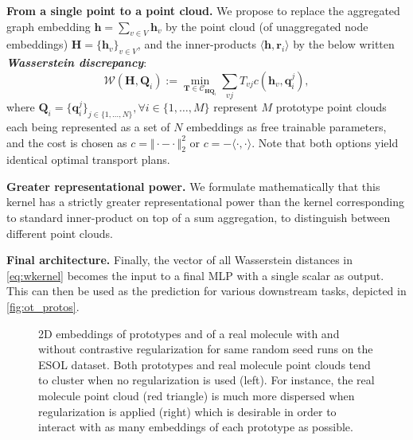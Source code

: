 \documentclass[letterpaper]{article} \usepackage{aaai22}  \usepackage{times}  \usepackage{helvet}  \usepackage{courier}  \usepackage[hyphens]{url}  \usepackage{graphicx} \urlstyle{rm} \def\UrlFont{\rm}  \usepackage{natbib}  \usepackage{caption} \DeclareCaptionStyle{ruled}{labelfont=normalfont,labelsep=colon,strut=off} \frenchspacing  \setlength{\pdfpagewidth}{8.5in}  \setlength{\pdfpageheight}{11in}  \usepackage{algorithm}
\newcommand{\h}{{\mathbf h}}
\newcommand{\T}{{\mathbf T}}
\newcommand{\Q}{{\mathbf Q}}
\newcommand{\q}{{\mathbf q}}
\newcommand{\Was}{{\mathcal W}}
\begin{document}
\textbf{From a single point to a point cloud. } We propose to replace the aggregated graph embedding $\h=\sum_{v\in V}\h_v$ by the point cloud (of unaggregated node embeddings) $\mathbf{H}=\{\h_v\}_{v\in V}$, and the inner-products $\langle \h,\mathbf{r}_i\rangle$ by the below written \textbf{\textit{Wasserstein discrepancy}}:
\begin{equation}
\Was(\mathbf{H}, \Q_i):=\min_{\T\in\mathcal{C}_{\mathbf{H} \Q_i}}\sum_{vj}T_{vj}c( \h_v, \q_i^j),
\label{eq:wkernel}
\end{equation}
where $\Q_i=\{\q_i^j\}_{j \in \{1,\ldots,N\}}, \forall i \in \{1,\ldots,M\}$ represent $M$ prototype point clouds each being represented as a set of $N$ embeddings as free trainable parameters, and the cost is chosen as $c=\Vert\cdot - \cdot\Vert_2^2$ or $c = - \langle \cdot,\cdot\rangle$. Note that both options yield identical optimal transport plans.

\textbf{Greater representational power. } We formulate mathematically that this kernel has a strictly greater representational power than the kernel corresponding to standard inner-product on top of a sum aggregation, to distinguish between different point clouds. 


\textbf{Final architecture. } Finally, the vector of all Wasserstein distances in \cref{eq:wkernel} becomes the input to a final MLP with a single scalar as output. This can then be used as the prediction for various downstream tasks, depicted in \cref{fig:ot_protos}.


\begin{figure*}[h]
   \hspace{15mm}
   \hspace{15mm}
  \caption{2D embeddings of prototypes and of a real molecule with and without contrastive regularization for same random seed runs on the ESOL dataset. Both prototypes and real molecule point clouds tend to cluster when no regularization is used (left). For instance, the real molecule point cloud (red triangle) is much more dispersed when regularization is applied (right) which is desirable in order to interact with as many embeddings of each prototype as possible.}
  \label{fig:nce_embeddings}
\end{figure*}

\vspace{-0.2cm}
\end{document}
